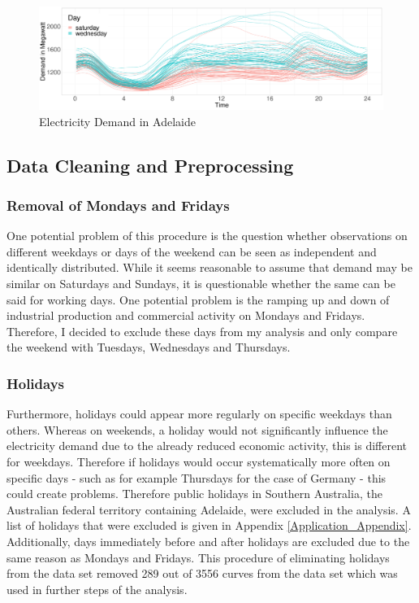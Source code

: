 \documentclass[12pt, a4paper]{article}
\theoremstyle{MAstyle} \newtheorem{assumption}{Assumption}[section]
\theoremstyle{MAstyle} \newtheorem{definition}{Definition}[section]
\theoremstyle{MAstyle} \newtheorem{theorem}{Theorem}[section]
\begin{document}
		\begin{figure}[H]
			\includegraphics[width=\textwidth]{../Graphics/electricity_demand_curves.PDF}
			\caption{Electricity Demand in Adelaide}
			\label{electricity_demand}
		\end{figure}
		
		\subsection{Data Cleaning and Preprocessing}
			\subsubsection{Removal of Mondays and Fridays}
			One potential problem of this procedure is the question whether observations on different weekdays or days of the weekend can be seen as independent and identically distributed. While it seems reasonable to assume that demand may be similar on Saturdays and Sundays, it is questionable whether the same can be said for working days. 
			One potential problem is the ramping up and down of industrial production and commercial activity on Mondays and Fridays. Therefore, I decided to exclude these days from my analysis and only compare the weekend with Tuesdays, Wednesdays and Thursdays.
			
			\subsubsection{Holidays}
			Furthermore, holidays could appear more regularly on specific weekdays than others. Whereas on weekends, a holiday would not significantly influence the electricity demand due to the already reduced economic activity, this is different for weekdays. Therefore if holidays would occur systematically more often on specific days - such as for example Thursdays for the case of Germany - this could create problems. Therefore public holidays in Southern Australia, the Australian federal territory containing Adelaide, were excluded in the analysis. A list of holidays that were excluded is given in Appendix \ref{Application_Appendix}. Additionally, days immediately before and after holidays are excluded due to the same reason as Mondays and Fridays. This procedure of eliminating holidays from the data set removed 289 out of 3556 curves from the data set which was used in further steps of the analysis. \\
			
\end{document}
